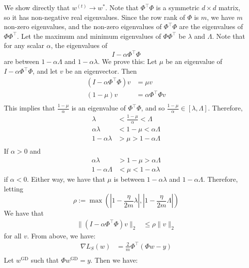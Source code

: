 \documentclass{amsart}
\theoremstyle{definition}
\begin{document}
\begin{enumerate}[(a)]
    We show directly that $w^{(t)} \to w^\ast$. Note that $\Phi^\top \Phi$ is a symmetric $d \times d$ matrix, so it has non-negative real eigenvalues. 
    Since the row rank of $\Phi$ is $m$, we have $m$ non-zero eigenvalues, and the non-zero eigenvalues of $\Phi^\top \Phi$ are the eigenvalues of $\Phi \Phi^\top$. 
    Let the maximum and minimum eigenvalues of $\Phi \Phi^\top$ be $\lambda$ and $\Lambda$. Note that for any scalar $\alpha$, the eigenvalues of 
    \[I - \alpha \Phi^\top \Phi\]
    are between $1 - \alpha \Lambda$ and $1 - \alpha \lambda$.
    We prove this:
    Let $\mu$ be an eigenvalue of $I - \alpha \Phi^\top \Phi$, and let $v$ be an eigenvector. Then
    \begin{align*}
      (I - \alpha \Phi^\top \Phi)v &= \mu v\\
      (1-\mu)v &= \alpha \Phi^\top \Phi v\\
    \end{align*}
    This implies that $\frac{1-\mu}{\alpha}$ is an eigenvalue of $\Phi^\top \Phi$, and so $\frac{1-\mu}{\alpha} \in [\lambda, \Lambda]$. 
    Therefore, 
    \begin{align*}
      \lambda &< \frac{1-\mu}{\alpha} < \Lambda\\
      \alpha \lambda &< 1 - \mu < \alpha \Lambda\\
      1- \alpha \lambda &> \mu > 1 - \alpha \Lambda\\
    \end{align*}
    If $\alpha > 0$ and 
    \begin{align*}
      \alpha \lambda &> 1 - \mu > \alpha \Lambda\\
      1 - \alpha \Lambda &< \mu < 1 - \alpha \lambda
    \end{align*}
    if $\alpha < 0$.
    Either way, we have that $\mu$ is between $1- \alpha \lambda$ and $1- \alpha \Lambda$. 
    Therefore, letting 
    \[\rho := \max\left(\left|1 - \frac{\eta}{2m} \lambda\right|, \left| 1 - \frac{\eta}{2m}\Lambda \right|\right)\]
    We have that 
    \begin{align*}
      \|(I - \alpha \Phi^\top \Phi) v\|_2 &\le \rho \|v\|_2
    \end{align*}
    for all $v$. 
    From above, we have:
    \begin{align*}
      \nabla L_S(w) &= \frac{2}{m}\Phi^\top(\Phi w - y)\\
    \end{align*}
    Let $w^{\mathrm{GD}}$ such that $\Phi w^{\mathrm{GD}} = y$. Then we have:
    \begin{align*}

\end{align*}
\end{enumerate}
\end{document}
